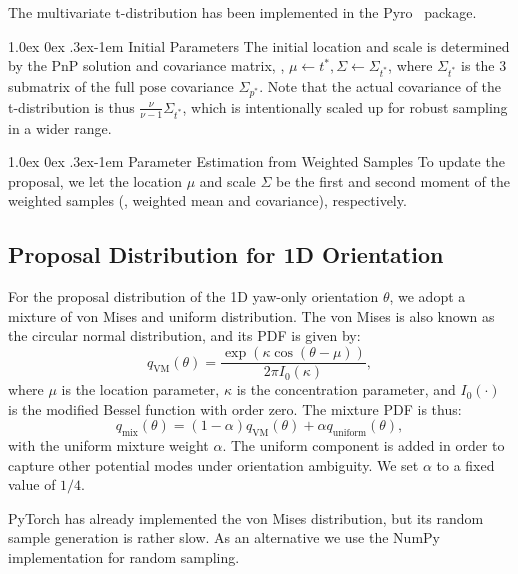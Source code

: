 \documentclass[10pt,twocolumn,letterpaper]{article}
\makeatletter
\renewcommand{\paragraph}{
  \@startsection{paragraph}{4}
  {\z@}{1.0ex \@plus 0ex \@minus .3ex}{-1em}
  {\normalfont\normalsize\bfseries}
}
\makeatother
\begin{document}
The multivariate t-distribution has been implemented in the Pyro~\cite{pyro} package.

\paragraph{Initial Parameters}
The initial location and scale is determined by the PnP solution and covariance matrix, \ie, $\mu \gets t^\ast, \Sigma \gets \Sigma_{t^\ast}$, where $\Sigma_{t^\ast}$ is the 3 submatrix of the full pose covariance $\Sigma_{p^\ast}$. Note that the actual covariance of the t-distribution is thus $\frac{\nu}{\nu-1}\Sigma_{t^\ast}$, which is intentionally scaled up for robust sampling in a wider range. 

\paragraph{Parameter Estimation from Weighted Samples}
To update the proposal, we let the location $\mu$ and scale $\Sigma$ be the first and second moment of the weighted samples (\ie, weighted mean and covariance), respectively.

\subsection{Proposal Distribution for 1D Orientation}
For the proposal distribution of the 1D yaw-only orientation $\theta$, we adopt a mixture of von Mises and uniform distribution. The von Mises is also known as the circular normal distribution, and its PDF is given by:
\begin{equation}
    q_\text{VM}(\theta) = \frac{\exp{(\kappa \cos{(\theta - \mu)})}}{2 \pi I_0(\kappa)},
\end{equation}
where $\mu$ is the location parameter, $\kappa$ is the concentration parameter, and $I_0(\cdot)$ is the modified Bessel function with order zero. The mixture PDF is thus:
\begin{equation}
    q_\text{mix}(\theta) = (1-\alpha)q_\text{VM}(\theta) + \alpha q_\text{uniform}(\theta),
\end{equation}
with the uniform mixture weight $\alpha$. The uniform component is added in order to capture other potential modes under orientation ambiguity. We set $\alpha$ to a fixed value of $1/4$.

PyTorch has already implemented the von Mises distribution, but its random sample generation is rather slow. As an alternative we use the NumPy implementation for random sampling.
\end{document}
